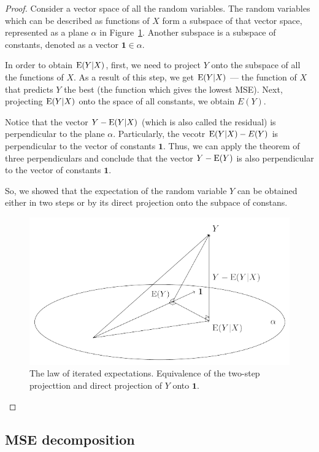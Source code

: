 \begin{proof}

Consider a vector space of all the random variables.  The random variables
which can be described as functions of $X$ form a subspace of that vector
space, represented as a plane $\alpha$ in Figure~\ref{fig:adams}.
Another subspace is a subspace of constants, denoted as a vector $\mathbf{1} \in \alpha$.

In order to obtain $\operatorname{E}(Y|X)$, first, we need to project $Y$ onto the subspace
of all the functions of $X$. As a result of this step, we get $\operatorname{E}(Y|X)$ — the function
of $X$ that predicts $Y$ the best (the function which gives the lowest MSE).
Next, projecting $\operatorname{E}(Y|X)$ onto the space of all constants, we obtain $E(Y)$.

Notice that the vector $Y - \operatorname{E}(Y|X)$ (which is also called the residual) is
perpendicular to the plane $\alpha$. Particularly, the vecotr $\operatorname{E}(Y|X) - E(Y)$ is
perpendicular to the vector of constants $\mathbf{1}$. Thus, we can apply
the theorem of three perpendiculars and conclude that the vector $Y - \operatorname{E}(Y)$ is
also perpendicular to the vector of constants $\mathbf{1}$.

So, we showed that the expectation of the random variable $Y$ can be obtained either
in two steps or by its direct projection onto the subpace of constans.

\begin{figure}[h!]
\begin{center}
\includegraphics[width=0.6\linewidth]{figures/01_law_of_iterated_expectations.pdf}
\caption{The law of iterated expectations. Equivalence of the two-step projecttion
and direct projection of $Y$ onto $\mathbf{1}$.}
\label{fig:adams}
\end{center}
\end{figure}

\end{proof}


\subsection{MSE decomposition}

